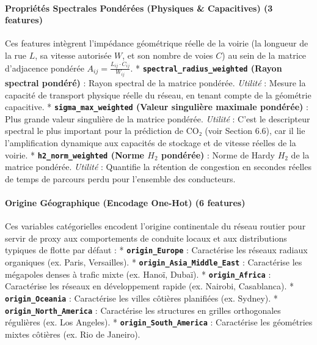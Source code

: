\documentclass[11pt, a4paper]{article}
\begin{document}
\paragraph{Propriétés Spectrales Pondérées (Physiques \& Capacitives) (3
features)}\label{propriuxe9tuxe9s-spectrales-ponduxe9ruxe9es-physiques-capacitives-3-features}

Ces features intègrent l'impédance géométrique réelle de la voirie (la
longueur de la rue \(L\), sa vitesse autorisée \(W\), et son nombre de
voies \(C\)) au sein de la matrice d'adjacence pondérée
\(A_{ij} = \frac{L_{ij} \cdot C_{ij}}{W_{ij}}\). *
\textbf{\texttt{spectral\_radius\_weighted} (Rayon spectral pondéré)} :
Rayon spectral de la matrice pondérée. \emph{Utilité} : Mesure la
capacité de transport physique réelle du réseau, en tenant compte de la
géométrie capacitive. * \textbf{\texttt{sigma\_max\_weighted} (Valeur
singulière maximale pondérée)} : Plus grande valeur singulière de la
matrice pondérée. \emph{Utilité} : C'est le descripteur spectral le plus
important pour la prédiction de CO₂ (voir Section 6.6), car il lie
l'amplification dynamique aux capacités de stockage et de vitesse
réelles de la voirie. * \textbf{\texttt{h2\_norm\_weighted} (Norme
\(H_2\) pondérée)} : Norme de Hardy \(H_2\) de la matrice pondérée.
\emph{Utilité} : Quantifie la rétention de congestion en secondes
réelles de temps de parcours perdu pour l'ensemble des conducteurs.

\paragraph{Origine Géographique (Encodage One-Hot) (6
features)}\label{origine-guxe9ographique-encodage-one-hot-6-features}

Ces variables catégorielles encodent l'origine continentale du réseau
routier pour servir de proxy aux comportements de conduite locaux et aux
distributions typiques de flotte par défaut : *
\textbf{\texttt{origin\_Europe}} : Caractérise les réseaux radiaux
organiques (ex. Paris, Versailles). *
\textbf{\texttt{origin\_Asia\_Middle\_East}} : Caractérise les mégapoles
denses à trafic mixte (ex. Hanoï, Dubaï). *
\textbf{\texttt{origin\_Africa}} : Caractérise les réseaux en
développement rapide (ex. Nairobi, Casablanca). *
\textbf{\texttt{origin\_Oceania}} : Caractérise les villes côtières
planifiées (ex. Sydney). * \textbf{\texttt{origin\_North\_America}} :
Caractérise les structures en grilles orthogonales régulières (ex. Los
Angeles). * \textbf{\texttt{origin\_South\_America}} : Caractérise les
géométries mixtes côtières (ex. Rio de Janeiro).
\end{document}
